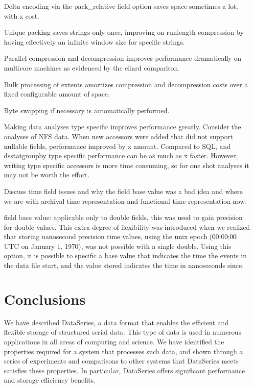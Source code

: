 \documentclass{acm_proc_article-sp}
\begin{document}
Delta encoding via the pack\_relative field option saves space
sometimes a lot, with x cost.

Unique packing saves strings only once, improving on runlength
compression by having effectively an infinite window size for specific
strings.

Parallel compression and decompression improves performance
dramatically on multicore machines as evidenced by the ellard
comparison.

Bulk processing of extents amortizes compression and decompression
costs over a fixed configurable amount of space.

Byte swapping if necessary is automatically performed.

Making data analyses type specific improves performance greatly.
Consider the analyses of NFS data.  When new accessors were added that
did not support nullable fields, performance improved by x amount.
Compared to SQL, and dsstatgroupby type specific performance can be as
much as x faster.  However, writing type specific accessors is more
time consuming, so for one shot analyses it may not be worth the
effort.

Discuss time field issues and why the field base value was a bad idea
and where we are with archival time representation and functional time
representation now.

field base value: applicable only to double fields,
this was used to gain precision for double values. This extra degree
of flexibility was introduced when we realized that storing nanosecond
precision time values, using the unix epoch (00:00:00 UTC on January
1, 1970), was not possible with a single double. Using this option, it
is possible to specific a base value that indicates the time the
events in the data file start, and the value stored indicates the time
in nanoseconds since.

\fi


\section{Conclusions}\label{sec:conclusions}

We have described DataSeries, a data format that enables the efficient
and flexible storage of structured serial data. This type of data is
used in numerous applications in all areas of computing and
science. We have identified the properties required for a system that
processes such data, and shown through a series of experiments and
comparisons to other systems that DataSeries meets satisfies these
properties. In particular, DataSeries offers significant performance
and storage efficiency benefits.  
\end{document}

